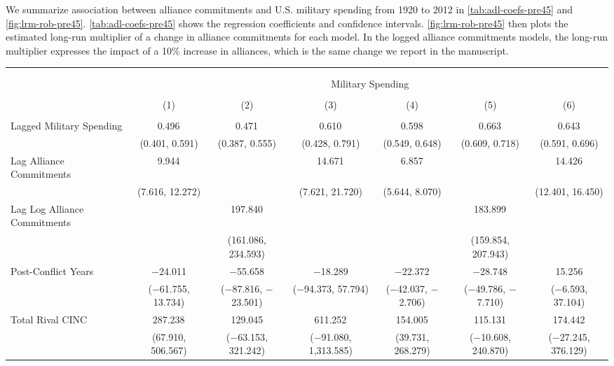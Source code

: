 \documentclass[12pt]{article}
\begin{document}
We summarize association between alliance commitments and U.S. military spending from 1920 to 2012 in \autoref{tab:adl-coefs-pre45} and \autoref{fig:lrm-rob-pre45}. 
\autoref{tab:adl-coefs-pre45} shows the regression coefficients and confidence intervals. 
\autoref{fig:lrm-rob-pre45} then plots the estimated long-run multiplier of a change in alliance commitments for each model.
In the logged alliance commitments models, the long-run multiplier expresses the impact of a 10\% increase in alliances, which is the same change we report in the manuscript. 


\begin{table} \centering  
\begin{adjustbox}{width= \textwidth}
\begin{tabular}{@{\extracolsep{5pt}}lcccccc} 
\\[-1.8ex]\hline \\[-1.8ex] 
\\[-1.8ex] & \multicolumn{6}{c}{Military Spending} \\ 
\\[-1.8ex] & (1) & (2) & (3) & (4) & (5) & (6)\\ 
\hline \\[-1.8ex] 
 Lagged Military Spending & 0.496$^{}$ & 0.471$^{}$ & 0.610$^{}$ & 0.598$^{}$ & 0.663$^{}$ & 0.643$^{}$ \\ 
  & (0.401, 0.591) & (0.387, 0.555) & (0.428, 0.791) & (0.549, 0.648) & (0.609, 0.718) & (0.591, 0.696) \\ 
  Lag Alliance Commitments & 9.944$^{}$ &  & 14.671$^{}$ & 6.857$^{}$ &  & 14.426$^{}$ \\ 
  & (7.616, 12.272) &  & (7.621, 21.720) & (5.644, 8.070) &  & (12.401, 16.450) \\ 
  Lag Log Alliance Commitments &  & 197.840$^{}$ &  &  & 183.899$^{}$ &  \\ 
  &  & (161.086, 234.593) &  &  & (159.854, 207.943) &  \\ 
  Post-Conflict Years & $-$24.011 & $-$55.658$^{}$ & $-$18.289 & $-$22.372$^{}$ & $-$28.748$^{}$ & 15.256 \\ 
  & ($-$61.755, 13.734) & ($-$87.816, $-$23.501) & ($-$94.373, 57.794) & ($-$42.037, $-$2.706) & ($-$49.786, $-$7.710) & ($-$6.593, 37.104) \\ 
  Total Rival CINC & 287.238$^{}$ & 129.045 & 611.252$^{}$ & 154.005$^{}$ & 115.131$^{}$ & 174.442$^{}$ \\ 
  & (67.910, 506.567) & ($-$63.153, 321.242) & ($-$91.080, 1,313.585) & (39.731, 268.279) & ($-$10.608, 240.870) & ($-$27.245, 376.129) \\ 

\end{tabular}
\end{adjustbox}
\end{table}
\end{document}
